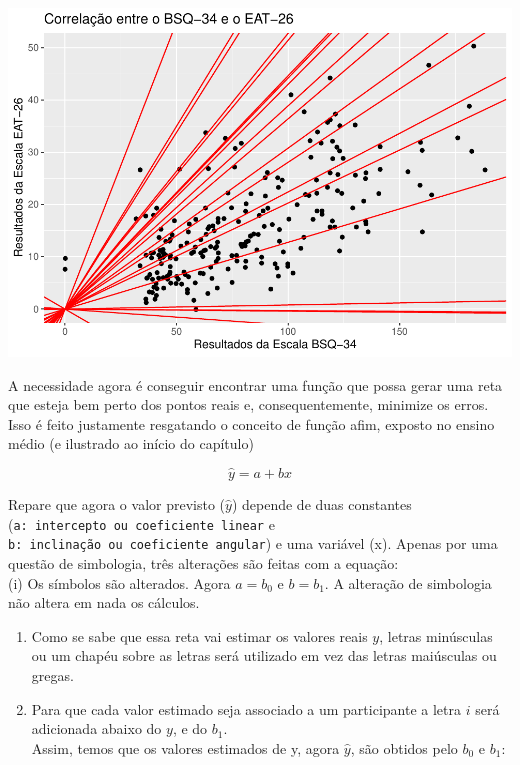 \documentclass[
]{book}
\begin{document}
\begin{center}\includegraphics{gitbook-demo_files/figure-latex/unnamed-chunk-81-1} \end{center}

A necessidade agora é conseguir encontrar uma função que possa gerar uma reta que esteja bem perto dos pontos reais e, consequentemente, minimize os erros. Isso é feito justamente resgatando o conceito de função afim, exposto no ensino médio (e ilustrado ao início do capítulo)

\[\hat{y} = a + bx\]

Repare que agora o valor previsto (\(\hat{y}\)) depende de duas constantes (\texttt{a:\ intercepto\ ou\ coeficiente\ linear} e \texttt{b:\ inclinação\ ou\ coeficiente\ angular}) e uma variável (x). Apenas por uma questão de simbologia, três alterações são feitas com a equação:\\
(i) Os símbolos são alterados. Agora \(a = b_0\) e \(b = b_1\). A alteração de simbologia não altera em nada os cálculos.

\begin{enumerate}
\def\labelenumi{(\roman{enumi})}
\setcounter{enumi}{1}
\item
  Como se sabe que essa reta vai estimar os valores reais \(y\), letras minúsculas ou um chapéu sobre as letras será utilizado em vez das letras maiúsculas ou gregas.
\item
  Para que cada valor estimado seja associado a um participante a letra \(i\) será adicionada abaixo do \(y\), e do \(b_1\).\\
  Assim, temos que os valores estimados de y, agora \(\hat{y}\), são obtidos pelo \(b_0\) e \(b_1\):
\end{enumerate}
\end{document}
